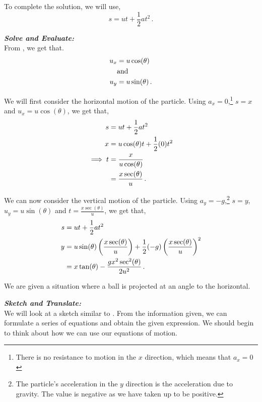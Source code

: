 \begin{subquestions}
To complete the solution, we will use,
\begin{equation}
	s = ut + \frac{1}{2}at^2 \,.
\end{equation}




\textbf{\textit{Solve and Evaluate:}} \\
From , we get that.
\begin{align}
	u_x & = u\cos(\theta) \\
	& \text{and} \nonumber \\
	u_y & = u\sin(\theta) \,.
\end{align} 

We will first consider the horizontal motion of the particle. Using $a_x=0$,\footnote{There is no resistance to motion in the $x$ direction, which means that $a_x=0$} $s=x$ and $u_x=u\cos(\theta)$, we get that,
\begin{align}
	s & = ut + \frac{1}{2}at^2 \nonumber \\
	x & = u\cos(\theta)t + \frac{1}{2}(0)t^2 \nonumber \\
	\implies t & = \frac{x}{u\cos(\theta)} \nonumber \\
	           & = \frac{x\sec(\theta)}{u} \,.
\end{align}	

We can now consider the vertical motion of the particle. Using $a_y=-g$,\footnote{The particle's acceleration in the $y$ direction is the acceleration due to gravity. The value is negative as we have taken up to be positive.} $s=y$, $u_y=u\sin(\theta)$ and $t=\frac{x\sec(\theta)}{u}$, we get that,
\begin{align}
	s & = ut + \frac{1}{2}at^2 \nonumber \\
	y & = u\sin(\theta)\left(\frac{x\sec(\theta)}{u}\right) + \frac{1}{2}(-g)\left(\frac{x\sec(\theta)}{u}\right)^2 \nonumber \\
	  & = x\tan(\theta) - \frac{gx^2\sec^2(\theta)}{2u^2} \,.
\end{align}
	
	
\subquestion
We are given a situation where a ball is projected at an angle to the horizontal.

\begin{subsubquestions}
	
\subsubquestion

\textbf{\textit{Sketch and Translate:}} \\
We will look at a sketch similar to . From the information given, we can formulate a series of equations and obtain the given expression. We should begin to think about how we can use our equations of motion.\\





\end{subsubquestions}
\end{subquestions}
